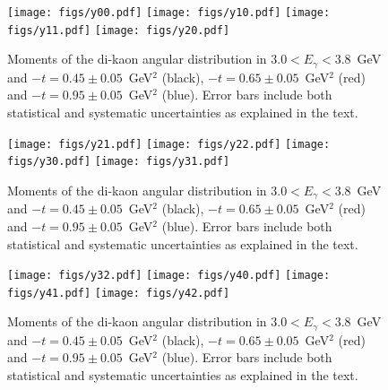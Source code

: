 \documentclass[twocolumn,superscriptaddress,prd]{revtex4}
\begin{document}
\begin{figure}
\texttt{[image: figs/y00.pdf]} 
\texttt{[image: figs/y10.pdf]} 
\texttt{[image: figs/y11.pdf]} 
\texttt{[image: figs/y20.pdf]} 
\caption[]{Moments of the di-kaon angular distribution  in $3.0 <E_\gamma< 3.8$~GeV 
and $-t=0.45\pm0.05$~GeV$^2$ (black), $-t=0.65\pm0.05$~GeV$^2$ (red) and $-t=0.95\pm0.05$~GeV$^2$ (blue). Error bars include both statistical and systematic uncertainties as explained in the text.}
\label{fig:final-2}
\end{figure}
\begin{figure}
\texttt{[image: figs/y21.pdf]} 
\texttt{[image: figs/y22.pdf]} 
\texttt{[image: figs/y30.pdf]} 
\texttt{[image: figs/y31.pdf]} 
\caption[]{Moments of the di-kaon angular distribution  in $3.0 <E_\gamma< 3.8$~GeV 
and $-t=0.45\pm0.05$~GeV$^2$ (black), $-t=0.65\pm0.05$~GeV$^2$ (red) and $-t=0.95\pm0.05$~GeV$^2$ (blue). Error bars include both statistical and systematic uncertainties as explained in the text. }
\label{fig:final-3}
\end{figure}
\begin{figure}
\texttt{[image: figs/y32.pdf]} 
\texttt{[image: figs/y40.pdf]} 
\texttt{[image: figs/y41.pdf]} 
\texttt{[image: figs/y42.pdf]} 
\caption[]{Moments of the di-kaon angular distribution  in $3.0 <E_\gamma< 3.8$~GeV 
and $-t=0.45\pm0.05$~GeV$^2$ (black), $-t=0.65\pm0.05$~GeV$^2$ (red) and $-t=0.95\pm0.05$~GeV$^2$ (blue). Error bars include both statistical and systematic uncertainties as explained in the text.}
\label{fig:final-4}
\end{figure}
\end{document}
